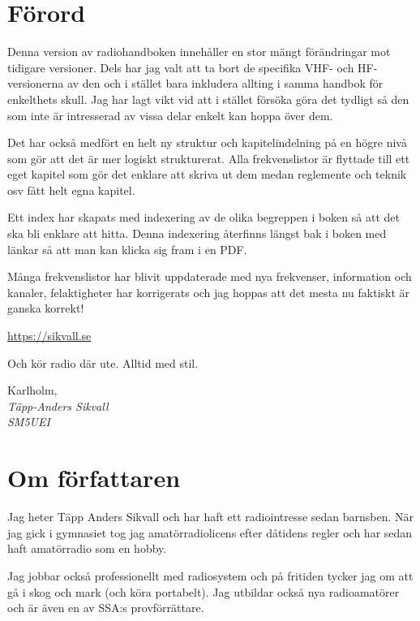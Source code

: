 \section*{Förord}

Denna version av radiohandboken innehåller en stor mängt förändringar mot
tidigare versioner. Dels har jag valt att ta bort de specifika VHF- och
HF-versionerna av den och i stället bara inkludera allting i samma handbok för
enkelthets skull. Jag har lagt vikt vid att i stället försöka göra det tydligt
så den som inte är intresserad av vissa delar enkelt kan hoppa över dem.

Det har också medfört en helt ny struktur och kapitelindelning på en högre
nivå som gör att det är mer logiskt strukturerat. Alla frekvenslistor är
flyttade till ett eget kapitel som gör det enklare att skriva ut dem medan
reglemente och teknik osv fått helt egna kapitel.

Ett index har skapats med indexering av de olika begreppen i boken så att det
ska bli enklare att hitta. Denna indexering återfinns längst bak i boken med
länkar så att man kan klicka sig fram i en PDF.

Många frekvenslistor har blivit uppdaterade med nya frekvenser, information
och kanaler, felaktigheter har korrigerats och jag hoppas att det mesta nu
faktiskt är ganska korrekt!


\url{https://sikvall.se}

Och kör radio där ute. Alltid med stil.

\vspace{4mm}

Karlholm, \DokumentDatum\\
\textit{Täpp-Anders Sikvall\\
	SM5UEI}

\section*{Om författaren}

Jag heter Täpp Anders Sikvall och har haft ett radiointresse sedan
barnsben. När jag gick i gymnasiet tog jag amatörradiolicens efter dåtidens
regler och har sedan haft amatörradio som en hobby.

Jag jobbar också professionellt med radiosystem och på fritiden tycker jag om
att gå i skog och mark (och köra portabelt). Jag utbildar också nya
radioamatörer och är även en av SSA:s provförrättare.

